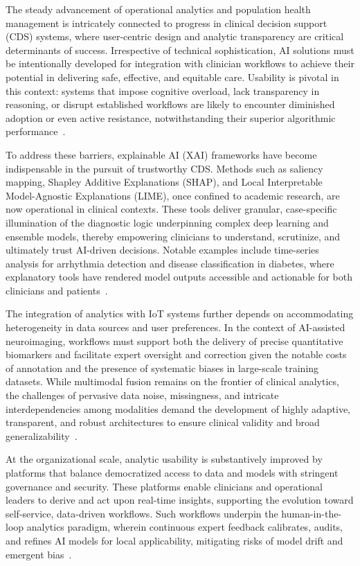 \documentclass[11pt]{article}
\begin{document}
The steady advancement of operational analytics and population health management is intricately connected to progress in clinical decision support (CDS) systems, where user-centric design and analytic transparency are critical determinants of success. Irrespective of technical sophistication, AI solutions must be intentionally developed for integration with clinician workflows to achieve their potential in delivering safe, effective, and equitable care. Usability is pivotal in this context: systems that impose cognitive overload, lack transparency in reasoning, or disrupt established workflows are likely to encounter diminished adoption or even active resistance, notwithstanding their superior algorithmic performance~\cite{ref89,ref99}.

To address these barriers, explainable AI (XAI) frameworks have become indispensable in the pursuit of trustworthy CDS. Methods such as saliency mapping, Shapley Additive Explanations (SHAP), and Local Interpretable Model-Agnostic Explanations (LIME), once confined to academic research, are now operational in clinical contexts. These tools deliver granular, case-specific illumination of the diagnostic logic underpinning complex deep learning and ensemble models, thereby empowering clinicians to understand, scrutinize, and ultimately trust AI-driven decisions. Notable examples include time-series analysis for arrhythmia detection and disease classification in diabetes, where explanatory tools have rendered model outputs accessible and actionable for both clinicians and patients~\cite{ref87,ref90}.

The integration of analytics with IoT systems further depends on accommodating heterogeneity in data sources and user preferences. In the context of AI-assisted neuroimaging, workflows must support both the delivery of precise quantitative biomarkers and facilitate expert oversight and correction given the notable costs of annotation and the presence of systematic biases in large-scale training datasets. While multimodal fusion remains on the frontier of clinical analytics, the challenges of pervasive data noise, missingness, and intricate interdependencies among modalities demand the development of highly adaptive, transparent, and robust architectures to ensure clinical validity and broad generalizability~\cite{ref78,ref90}.

At the organizational scale, analytic usability is substantively improved by platforms that balance democratized access to data and models with stringent governance and security. These platforms enable clinicians and operational leaders to derive and act upon real-time insights, supporting the evolution toward self-service, data-driven workflows. Such workflows underpin the human-in-the-loop analytics paradigm, wherein continuous expert feedback calibrates, audits, and refines AI models for local applicability, mitigating risks of model drift and emergent bias~\cite{ref84,ref106}.
\end{document}
